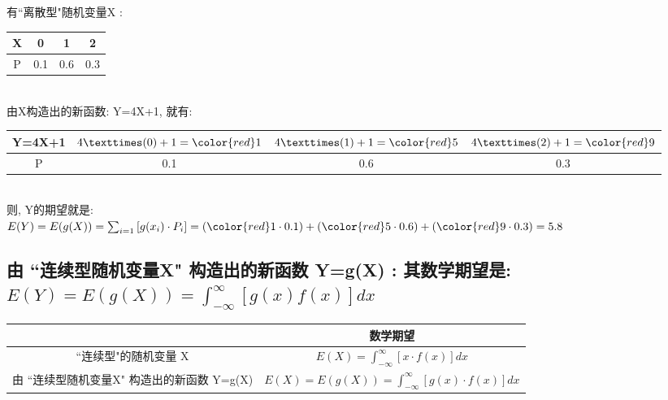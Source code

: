 \documentclass[UTF8]{ctexart}
\begin{document}
\begin{myEnvSample}
	有``离散型"随机变量X : \\
	\begin{tabular}{|c|c|c|c|}
		\hline
		X & 0 & 1 & 2 \\
		\hline
		P & 0.1 & 0.6 & 0.3 \\
		\hline
	\end{tabular} \\

由X构造出的新函数: Y=4X+1, 就有: \\
	\begin{tabular}{|c|c|c|c|}
	\hline
	Y=4X+1 & $4×(0)+1={\color{red}1}$ & $4×(1)+1={\color{red}5}$ & $4×(2)+1={\color{red}9}$ \\
	\hline
	P & 0.1 & 0.6 & 0.3 \\
	\hline
\end{tabular} \\

则, Y的期望就是:  \\
$
E(Y)=E(g(X))=\sum_{i=1}^{}{\left[ g(x_i)\cdot P_i \right]}=({\color{red}1}\cdot 0.1)+({\color{red}5}\cdot 0.6)+({\color{red}9}\cdot 0.3)=5.8
$
\end{myEnvSample}




\subsection{由 ``连续型随机变量X" 构造出的新函数 Y=g(X) : 其数学期望是: \\ $
	E\left( Y \right) =E(g(X))=\int_{-\infty}^{\infty}{\left[ g\left( x \right) f\left( x \right) \right]}dx	$}

	\begin{tabular}{|c|c|}
		\hline
		& 数学期望 \\
		\hline
		``连续型"的随机变量 X &  $E(X)=\int_{-\infty}^{\infty}{[x\cdot f(x)]dx}$\\
		\hline
		由 ``连续型随机变量X" 构造出的新函数 Y=g(X) &  $E(X)=E(g(X))=\int_{-\infty}^{\infty}{[g(x)\cdot f(x)]dx}$\\
		\hline
	\end{tabular} \\
	\vspace{1em} 
	
	
	
\end{document}
